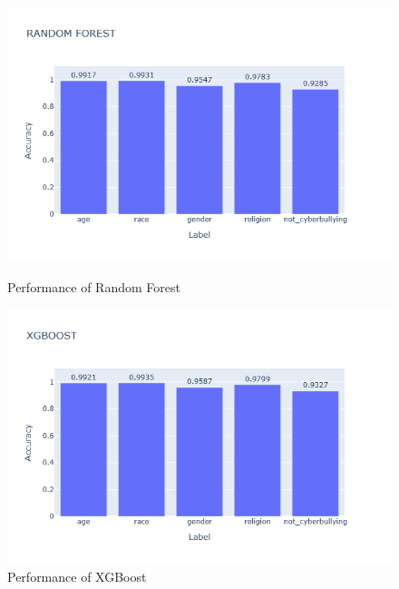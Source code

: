 \documentclass[pdflatex,sn-mathphys-num]{sn-jnl}%
\theoremstyle{thmstyleone}%
\theoremstyle{thmstyletwo}%
\theoremstyle{thmstylethree}%
\begin{document}
\begin{figure}[H]
    \begin{minipage}{0.48\textwidth}
        \centering
        \includegraphics[width=\textwidth]{Graphs/RANDOM FOREST.png}
        \caption{Performance of Random Forest}
        \label{fig:random_forest}
    \end{minipage}
    \hfill
    \begin{minipage}{0.48\textwidth}
        \centering
        \includegraphics[width=\textwidth]{Graphs/XGBOOST.png}
        \caption{Performance of XGBoost}
        \label{fig:xgboost}
    \end{minipage}
\end{figure}
\end{document}
